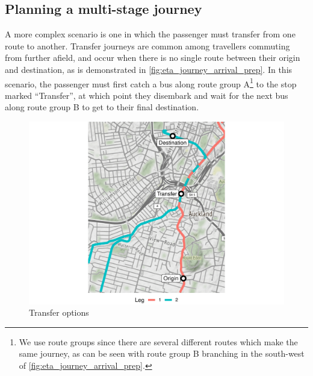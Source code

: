 \subsection{Planning a multi-stage journey}
\label{sec:journey_transfer}

A more complex scenario is one in which the passenger must transfer from one route to another. Transfer journeys are common among travellers commuting from further afield, and occur when there is no single route between their origin and destination, as is demonstrated in \cref{fig:eta_journey_arrival_prep}. In this scenario, the passenger must first catch a bus along route group A\footnote{We use route groups since there are several different routes which make the same journey, as can be seen with route group B branching in the south-west of \cref{fig:eta_journey_arrival_prep}.} to the stop marked ``Transfer'', at which point they disembark and wait for the next bus along route group B to get to their final destination.


\begin{knitrout}\small
{}\color{fgcolor}\begin{figure}

{\centering \includegraphics[width=\textwidth]{figure/eta_journey_transfer_prep-1} 

}

\caption[Transfer options]{Transfer options}\label{fig:eta_journey_transfer_prep}
\end{figure}


\end{knitrout}



